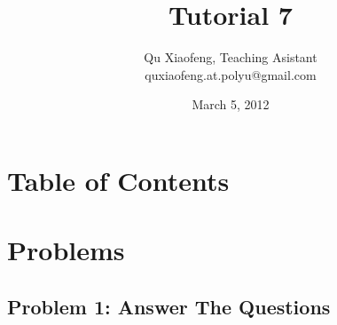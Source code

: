 \documentclass[
        ]{beamer}
\title{Tutorial 7}
\author[COMP435p]{Qu Xiaofeng\texorpdfstring{, Teaching Asistant\\\tiny{quxiaofeng.at.polyu@gmail.com}}{}}
\institute{COMP435p\\Biometrics Authentication}
\date{March 5, 2012}
\begin{document}
\newcommand{\inpdfu}[2]{\begin{figure}\centering\texttt{[image: im/lecture\_\#1]}\end{figure}}
\newcommand{\inpdfl}[2]{\begin{figure}\centering\texttt{[image: im/lecture\_\#1]}\end{figure}}
\newcommand{\inpdfc}[2]{\begin{figure}\centering\texttt{[image: im/lecture\_\#1]}\end{figure}}
\newcommand{\inpng}[1]{\begin{figure}\centering\texttt{[image: im/\#1]}\end{figure}}

\frame{\titlepage}

\section*{Table of Contents}

    \begin{frame}{\secname}
        \tableofcontents
    \end{frame}




\section{Problems}

    \subsection{Problem 1: Answer The Questions}
    
\end{document}
